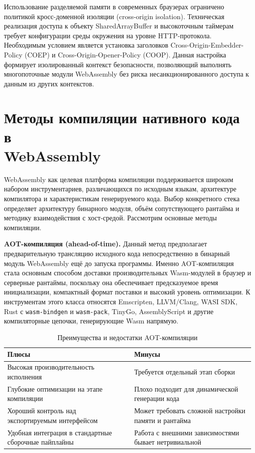 \documentclass[12pt, oneside]{book}
\begin{document}
    \quad Использование разделяемой памяти в современных браузерах ограничено политикой кросс-доменной изоляции (cross-origin isolation). Техническая реализация доступа к объекту SharedArrayBuffer и высокоточным таймерам требует конфигурации среды окружения на уровне HTTP-протокола. Необходимым условием является установка заголовков Cross-Origin-Embedder-Policy (COEP) и Cross-Origin-Opener-Policy (COOP). Данная настройка формирует изолированный контекст безопасности, позволяющий выполнять многопоточные модули WebAssembly без риска несанкционированного доступа к данным из других контекстов.


\section{Методы компиляции нативного кода в\\ WebAssembly}

    \quad WebAssembly как целевая платформа компиляции поддерживается широким набором инструментариев, различающихся по исходным языкам, архитектуре компилятора и характеристикам генерируемого кода. Выбор конкретного стека определяет архитектуру бинарного модуля, объём сопутствующего рантайма и методику взаимодействия с хост-средой. Рассмотрим основные методы компиляции.

    \quad \textbf{AOT-компиляция (ahead-of-time).} Данный метод предполагает предварительную трансляцию исходного кода непосредственно в бинарный модуль WebAssembly ещё до запуска программы. Именно AOT-компиляция стала основным способом доставки производительных Wasm-модулей в браузер и серверные рантаймы, поскольку она обеспечивает предсказуемое время инициализации, компактный формат поставки и высокий уровень оптимизации. К инструментам этого класса относятся Emscripten, LLVM/Clang, WASI SDK, Rust с \texttt{wasm-bindgen} и \texttt{wasm-pack}, TinyGo, AssemblyScript и другие компиляторные цепочки, генерирующие Wasm напрямую.

\begin{table}[htbp]
\centering
\scriptsize
\renewcommand{\arraystretch}{1.15}
\begin{tabular}{|p{5.8cm}|p{5.8cm}|}
\hline
\textbf{Плюсы} & \textbf{Минусы} \\
\hline
Высокая производительность исполнения & Требуется отдельный этап сборки \\
\hline
Глубокие оптимизации на этапе компиляции & Плохо подходит для динамической генерации кода \\
\hline
Хороший контроль над экспортируемым интерфейсом & Может требовать сложной настройки памяти и рантайма \\
\hline
Удобная интеграция в стандартные сборочные пайплайны & Работа с внешними зависимостями бывает нетривиальной \\
\hline
\end{tabular}
\caption{Преимущества и недостатки AOT-компиляции}
\label{tab:aot_pros_cons}
\end{table}
\end{document}
